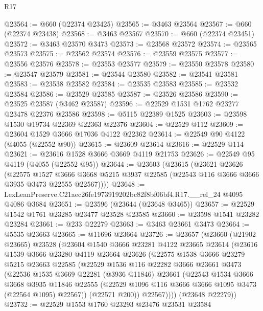 \begin{lexlean}{R17}
\begin{coremodule}
@23564 := @660 (@22374 @23425)
@23565 := @3463 @23564
@23567 := @660 (@22374 @23438)
@23568 := @3463 @23567
@23570 := @660 (@22374 @23451)
@23572 := @3463 @23570 @3473
@23573 := @23568 @23572
@23574 := @23565 @23573
@23575 := @23562 @23574
@23576 := @23559 @23575
@23577 := @23556 @23576
@23578 := @23553 @23577
@23579 := @23550 @23578
@23580 := @23547 @23579
@23581 := @23544 @23580
@23582 := @23541 @23581
@23583 := @23538 @23582
@23584 := @23535 @23583
@23585 := @23532 @23584
@23586 := @23529 @23585
@23587 := @23526 @23586
@23590 := @23525 @23587 (@3462 @23587)
@23596 := @22529 @1531 @1762 @23277 @23478 @22376 @23586
@23598 := @5115 @22389 @1525
@23603 := @23598 @1530 @19734 @22369 @22363 @22376
@23604 := @22529 @112
@23609 := @23604 @1529 @3666 @17036 @4122 @22362
@23614 := @22549 @90 @4122 (@4055 (@22552 @90))
@23615 := @23609 @23614
@23616 := @22529 @114
@23621 := @23616 @1528 @3666 @3669 @4119 @21753
@23626 := @22549 @95 @4119 (@4055 (@22552 @95))
@23644 := @23603
    (@23615
      (@23621
        @23626
        (@22575
          @1527
          @3666
          @3668
          @5215
          @3937
          @22585
          (@22543 @116 @3666 @3666 @3935 @3473 @22555 @22567))))
@23648 := LexLeanPreserve.C21aec26fe1973919202bc82f8bf06bf4.R17.__rel_24 @4095 @4086 @3684
@23651 := @23596 (@23644 (@23648 @3465))
@23657 := @22529 @1542 @1761 @23285 @23477 @23528 @23585
@23660 := @23598 @1541 @23282 @23284
@23661 := @233 @22279
@23663 := @3463 @23661 @3473
@23664 := @5535 @23663
@23665 := @11696 @23664
@23726 := @23657
    (@23660
      (@21902 @23665)
      @23528
      (@23604
        @1540
        @3666
        @23281
        @4122
        @23665
        @23614
        (@23616
          @1539
          @3666
          @23280
          @4119
          @23664
          @23626
          (@22575
            @1538
            @3666
            @23279
            @5215
            @23663
            @22585
            (@22529
              @1536
              @116
              @22282
              @3666
              @23661
              @3473
              (@22536
                @1535
                @3669
                @22281
                (@3936 @11846)
                @23661
                (@22543
                  @1534
                  @3666
                  @3668
                  @3935
                  @11846
                  @22555
                  (@22529 @1096 @116 @3666 @3666 @1095 @3473 (@22564 @1095) @22567))
                (@22571 @200))
              @22567))))
      (@23648 @22279))
@23732 := @22529 @1553 @1760 @23293 @23476 @23531 @23584

\end{coremodule}
\end{lexlean}
